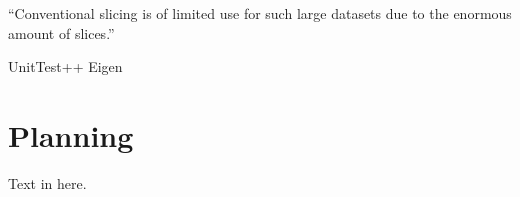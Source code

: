 \documentclass[11pt,fleqn,twoside]{article}
\begin{document}
``Conventional slicing is of limited use for such large datasets
due to the enormous amount of slices.''\cite{LargeVolumesThesis}

UnitTest++
Eigen

\section{Planning}
Text in here.



\nocite{*} %

\newpage
{} 

%
%

\renewcommand{\refname}{Annotated Bibliography}  %
\end{document}
